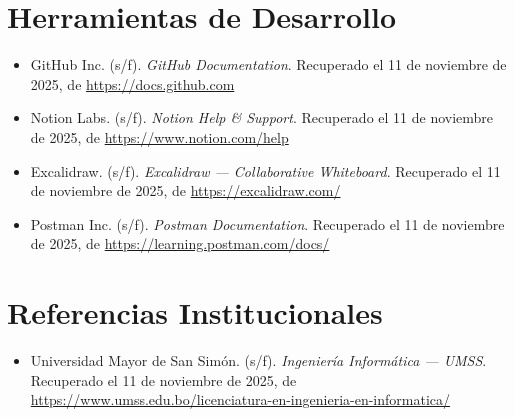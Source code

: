 \section{Herramientas de Desarrollo}

\begin{itemize}[leftmargin=1.5em]
  \item GitHub Inc. (s/f). \textit{GitHub Documentation}.
        Recuperado el 11 de noviembre de 2025, de
        \url{https://docs.github.com}

  \item Notion Labs. (s/f). \textit{Notion Help \& Support}.
        Recuperado el 11 de noviembre de 2025, de
        \url{https://www.notion.com/help}

  \item Excalidraw. (s/f). \textit{Excalidraw — Collaborative Whiteboard}.
        Recuperado el 11 de noviembre de 2025, de
        \url{https://excalidraw.com/}

  \item Postman Inc. (s/f). \textit{Postman Documentation}.
        Recuperado el 11 de noviembre de 2025, de
        \url{https://learning.postman.com/docs/}
\end{itemize}

\section{Referencias Institucionales}

\begin{itemize}[leftmargin=1.5em]
  \item Universidad Mayor de San Simón. (s/f).
        \textit{Ingeniería Informática — UMSS}.
        Recuperado el 11 de noviembre de 2025, de
        \url{https://www.umss.edu.bo/licenciatura-en-ingenieria-en-informatica/}
\end{itemize}